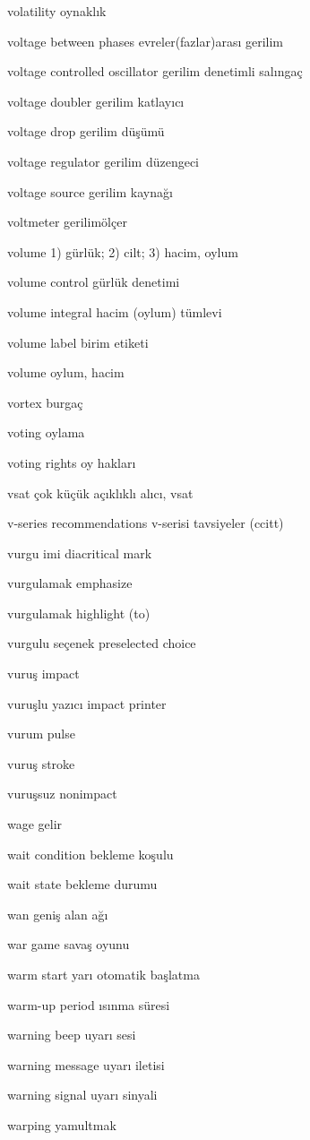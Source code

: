 \documentclass[12pt,fleqn]{article}\usepackage{../../common}
\begin{document}
volatility oynaklık

voltage between phases evreler(fazlar)arası gerilim

voltage controlled oscillator gerilim denetimli salıngaç

voltage doubler gerilim katlayıcı

voltage drop gerilim düşümü

voltage regulator gerilim düzengeci

voltage source gerilim kaynağı

voltmeter gerilimölçer

volume 1) gürlük; 2) cilt; 3) hacim, oylum

volume control gürlük denetimi

volume integral hacim (oylum) tümlevi

volume label birim etiketi

volume oylum, hacim

vortex burgaç

voting oylama

voting rights oy hakları

vsat çok küçük açıklıklı alıcı, vsat

v-series recommendations v-serisi tavsiyeler (ccitt)

vurgu imi diacritical mark

vurgulamak emphasize

vurgulamak highlight (to)

vurgulu seçenek preselected choice

vuruş impact

vuruşlu yazıcı impact printer

vurum pulse

vuruş stroke

vuruşsuz nonimpact

wage gelir

wait condition bekleme koşulu

wait state bekleme durumu

wan geniş alan ağı

war game savaş oyunu

warm start yarı otomatik başlatma

warm-up period ısınma süresi

warning beep uyarı sesi

warning message uyarı iletisi

warning signal uyarı sinyali

warping yamultmak
\end{document}
